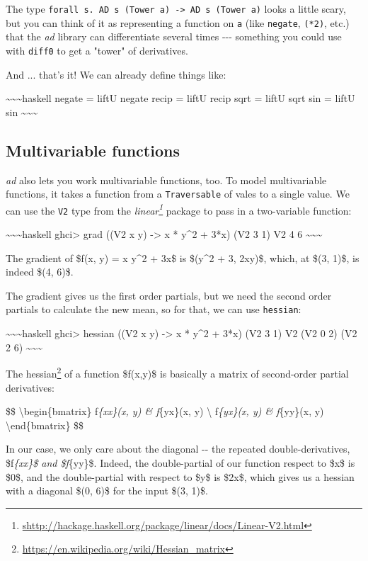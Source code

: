 \documentclass[]{article}
\renewcommand{\href}[2]{#2\footnote{\url{#1}}}
\begin{document}
The type
\texttt{forall\ s.\ AD\ s\ (Tower\ a)\ -\textgreater{}\ AD\ s\ (Tower\ a)} looks
a little scary, but you can think of it as representing a function on \texttt{a}
(like \texttt{negate}, \texttt{(*2)}, etc.) that the \emph{ad} library can
differentiate several times -\/-\/- something you could use with \texttt{diff0}
to get a "tower" of derivatives.

And ... that's it! We can already define things like:

\textasciitilde{}\textasciitilde{}\textasciitilde{}haskell negate = liftU negate
recip = liftU recip sqrt = liftU sqrt sin = liftU sin
\textasciitilde{}\textasciitilde{}\textasciitilde{}

\subsection{Multivariable functions}

\emph{ad} also lets you work multivariable functions, too. To model
multivariable functions, it takes a function from a \texttt{Traversable} of
vales to a single value. We can use the \texttt{V2} type from the
\emph{\href{shttp://hackage.haskell.org/package/linear/docs/Linear-V2.html}{linear}}
package to pass in a two-variable function:

\textasciitilde{}\textasciitilde{}\textasciitilde{}haskell ghci\textgreater{}
grad ((V2 x y) -\textgreater{} x * y\^{}2 + 3*x) (V2 3 1) V2 4 6
\textasciitilde{}\textasciitilde{}\textasciitilde{}

The gradient of \$f(x, y) = x y\^{}2 + 3x\$ is \$(y\^{}2 + 3, 2xy)\$, which, at
\$(3, 1)\$, is indeed \$(4, 6)\$.

The gradient gives us the first order partials, but we need the second order
partials to calculate the new mean, so for that, we can use \texttt{hessian}:

\textasciitilde{}\textasciitilde{}\textasciitilde{}haskell ghci\textgreater{}
hessian ((V2 x y) -\textgreater{} x * y\^{}2 + 3*x) (V2 3 1) V2 (V2 0 2) (V2 2
6) \textasciitilde{}\textasciitilde{}\textasciitilde{}

The \href{https://en.wikipedia.org/wiki/Hessian_matrix}{hessian} of a function
\$f(x,y)\$ is basically a matrix of second-order partial derivatives:

\$\$ \textbackslash{}begin\{bmatrix\} f\emph{\{xx\}(x, y) \& f}\{yx\}(x, y)
\textbackslash{} f\emph{\{yx\}(x, y) \& f}\{yy\}(x, y)
\textbackslash{}end\{bmatrix\} \$\$

In our case, we only care about the diagonal -\/- the repeated
double-derivatives, \$f\emph{\{xx\}\$ and \$f}\{yy\}\$. Indeed, the
double-partial of our function respect to \$x\$ is \$0\$, and the double-partial
with respect to \$y\$ is \$2x\$, which gives us a hessian with a diagonal \$(0,
6)\$ for the input \$(3, 1)\$.
\end{document}
